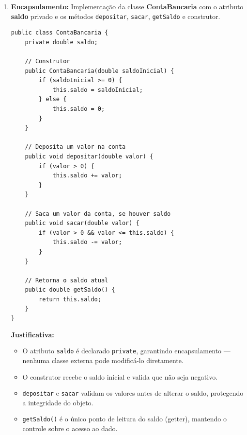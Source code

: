 \documentclass[12pt,a4paper]{article}
\begin{document}
\begin{enumerate}
\vspace{0.4cm}

\item \textbf{Encapsulamento:} Implementação da classe \textbf{ContaBancaria} com o atributo \textbf{saldo} privado e os métodos \texttt{depositar}, \texttt{sacar}, \texttt{getSaldo} e construtor.

\begin{tcolorbox}[respostabox]
\begin{lstlisting}
public class ContaBancaria {
    private double saldo;

    // Construtor
    public ContaBancaria(double saldoInicial) {
        if (saldoInicial >= 0) {
            this.saldo = saldoInicial;
        } else {
            this.saldo = 0;
        }
    }

    // Deposita um valor na conta
    public void depositar(double valor) {
        if (valor > 0) {
            this.saldo += valor;
        }
    }

    // Saca um valor da conta, se houver saldo
    public void sacar(double valor) {
        if (valor > 0 && valor <= this.saldo) {
            this.saldo -= valor;
        }
    }

    // Retorna o saldo atual
    public double getSaldo() {
        return this.saldo;
    }
}
\end{lstlisting}

\textbf{Justificativa:}
\begin{itemize}
    \item O atributo \texttt{saldo} é declarado \texttt{private}, garantindo encapsulamento — nenhuma classe externa pode modificá-lo diretamente.
    \item O construtor recebe o saldo inicial e valida que não seja negativo.
    \item \texttt{depositar} e \texttt{sacar} validam os valores antes de alterar o saldo, protegendo a integridade do objeto.
    \item \texttt{getSaldo()} é o único ponto de leitura do saldo (getter), mantendo o controle sobre o acesso ao dado.
\end{itemize}
\end{tcolorbox}

\vspace{0.4cm}


\end{enumerate}
\end{document}
